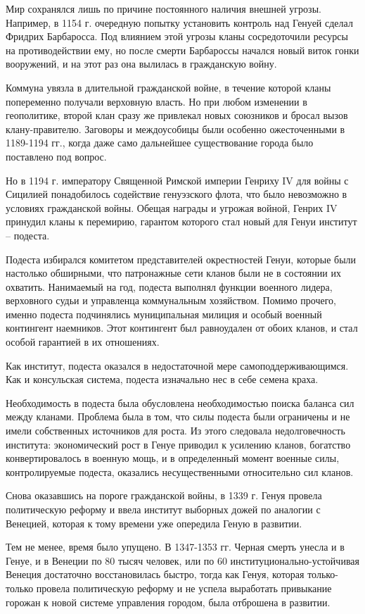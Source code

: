 Мир сохранялся лишь по причине постоянного наличия внешней угрозы. Например, в
1154 г. очередную попытку установить контроль над Генуей сделал Фридрих
Барбаросса. Под влиянием этой угрозы кланы сосредоточили ресурсы на
противодействии ему, но после смерти Барбароссы начался новый виток гонки
вооружений, и на этот раз она вылилась в гражданскую войну.

Коммуна увязла в длительной гражданской войне, в течение которой кланы
попеременно получали верховную власть. Но при любом изменении в геополитике,
второй клан сразу же привлекал новых союзников и бросал вызов клану-правителю.
Заговоры и междоусобицы были особенно ожесточенными в 1189-1194 гг., когда даже
само дальнейшее существование города было поставлено под вопрос.

Но в 1194 г. императору Священной Римской империи Генриху IV для войны с
Сицилией понадобилось содействие генуэзского флота, что было невозможно в
условиях гражданской войны. Обещая награды и угрожая войной, Генрих IV принудил
кланы к перемирию, гарантом которого стал новый для Генуи институт – подеста.

Подеста избирался комитетом представителей окрестностей Генуи, которые были
настолько обширными, что патронажные сети кланов были не в состоянии их
охватить. Нанимаемый на год, подеста выполнял функции военного лидера,
верховного судьи и управленца коммунальным хозяйством. Помимо прочего, именно
подеста подчинялись муниципальная милиция и особый военный контингент
наемников. Этот контингент был равноудален от обоих кланов, и стал особой
гарантией в их отношениях.

Как институт, подеста оказался в недостаточной мере самоподдерживающимся. Как и
консульская система, подеста изначально нес в себе семена краха.

Необходимость в подеста была обусловлена необходимостью поиска баланса сил
между кланами. Проблема была в том, что силы подеста были ограничены и не имели
собственных источников для роста. Из этого следовала недолговечность института:
экономический рост в Генуе приводил к усилению кланов, богатство
конвертировалось в военную мощь, и в определенный момент военные силы,
контролируемые подеста, оказались несущественными относительно сил кланов.

Снова оказавшись на пороге гражданской войны, в 1339 г. Генуя провела
политическую реформу и ввела институт выборных дожей по аналогии с Венецией,
которая к тому времени уже опередила Геную в развитии.

Тем не менее, время было упущено. В 1347-1353 гг. Черная смерть унесла и в
Генуе, и в Венеции по 80 тысяч человек, или по 60%
институционально-устойчивая Венеция достаточно восстановилась быстро, тогда как
Генуя, которая только-только провела политическую реформу и не успела
выработать привыкание горожан к новой системе управления городом, была
отброшена в развитии.

